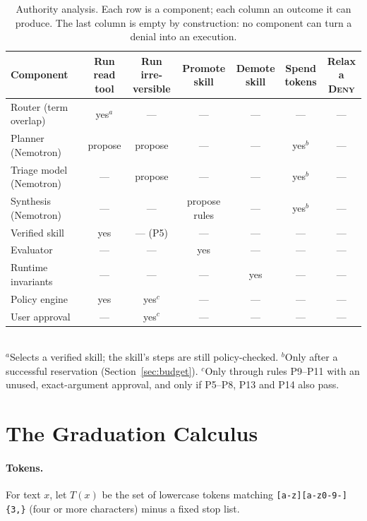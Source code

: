 \documentclass[11pt]{article}
\newcommand{\code}[1]{\texttt{#1}}
\newcommand{\Deny}{\textsc{Deny}}
\begin{document}
\begin{table}[!htbp]
\centering\small
\caption{Authority analysis. Each row is a component; each column an outcome it can produce. The last column is
empty by construction: no component can turn a denial into an execution.}
\label{tab:authority}
\setlength{\tabcolsep}{4pt}
\begin{tabular}{lcccccc}
\toprule
Component & \shortstack{Run read\\tool} & \shortstack{Run irre-\\versible} & \shortstack{Promote\\skill} & \shortstack{Demote\\skill} & \shortstack{Spend\\tokens} & \shortstack{Relax a\\\Deny}\\
\midrule
Router (term overlap) & yes$^a$ & --- & --- & --- & --- & ---\\
Planner (Nemotron) & propose & propose & --- & --- & yes$^b$ & ---\\
Triage model (Nemotron) & --- & propose & --- & --- & yes$^b$ & ---\\
Synthesis (Nemotron) & --- & --- & propose rules & --- & yes$^b$ & ---\\
Verified skill & yes & --- (P5) & --- & --- & --- & ---\\
Evaluator & --- & --- & yes & --- & --- & ---\\
Runtime invariants & --- & --- & --- & yes & --- & ---\\
Policy engine & yes & yes$^c$ & --- & --- & --- & ---\\
User approval & --- & yes$^c$ & --- & --- & --- & ---\\
\bottomrule
\end{tabular}
\\[2pt]{\footnotesize $^a$Selects a verified skill; the skill's steps are still policy-checked. $^b$Only after a
successful reservation (Section~\ref{sec:budget}). $^c$Only through rules P9--P11 with an unused, exact-argument
approval, and only if P5--P8, P13 and P14 also pass.}
\end{table}

\section{The Graduation Calculus}\label{sec:calculus}

\paragraph{Tokens.} For text $x$, let $T(x)$ be the set of lowercase tokens matching \code{[a-z][a-z0-9-]\{3,\}}
(four or more characters) minus a fixed stop list.
\end{document}
